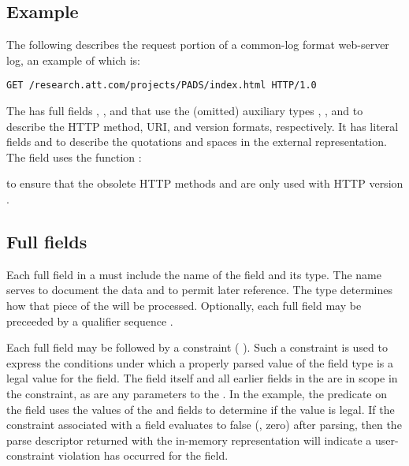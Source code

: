 \subsection{Example}
The following \Pstruct{} describes the request portion of a
common-log format web-server log, an example of which is:
\begin{center}
\begin{verbatim}
GET /research.att.com/projects/PADS/index.html HTTP/1.0
\end{verbatim}
\end{center}

\noindent
The \Pstruct{}  has full fields ,
, and  that use the (omitted) auxiliary types
,
, and
 to describe
the HTTP method, URI, and  version formats, respectively.  
It has literal fields  and
 to describe the quotations and spaces in the external
representation. 
The  field uses the \C{}
function :

to ensure that the obsolete HTTP methods
 and  are only used with HTTP version .


\subsection{Full fields}
\label{sec:structs-full-fields}
Each full field in a \Pstruct{} must include the name of the field
and its type.  
The name serves to document the data and to permit later reference.  
The type determines how that piece of the \Pstruct{} will be
processed.  
Optionally, each full field may be preceeded by a qualifier sequence
\cf{} .  

Each full field may be followed by a constraint (\cf{}
).  Such a constraint is used to express
the conditions under which a properly parsed value of the field type
is a legal value for the field.  The field itself and all earlier
fields in the \Pstruct{} are in scope in the constraint, as are any
parameters to the \Pstruct{}.  In the example, the 
predicate on the  field uses the values of the 
and  fields to determine if the  value is
legal. 
If the constraint associated with a field evaluates to false
(\ie{}, zero) after parsing, then the parse descriptor returned with
the in-memory representation will indicate a user-constraint violation
has occurred for the field.


